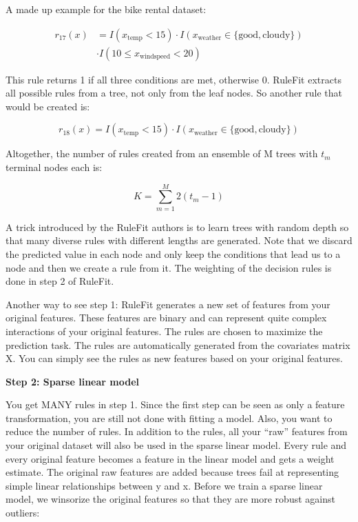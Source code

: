 \documentclass[
  11pt,
]{scrbook}
\begin{document}
A made up example for the bike rental dataset:

\begin{align*}
r_{17}(x) & = I(x_{\text{temp}}<15) \cdot I(x_{\text{weather}}\in\{\text{good},\text{cloudy}\}) \\
            & \cdot I(10\leq x_{\text{windspeed}}<20) 
\end{align*}

This rule returns 1 if all three conditions are met, otherwise 0.
RuleFit extracts all possible rules from a tree, not only from the leaf nodes.
So another rule that would be created is:

\[r_{18}(x)=I(x_{\text{temp}}<15)\cdot I(x_{\text{weather}}\in\{\text{good},\text{cloudy}\})\]

Altogether, the number of rules created from an ensemble of M trees with \(t_m\) terminal nodes each is:

\[K=\sum_{m=1}^M2(t_m-1)\]

A trick introduced by the RuleFit authors is to learn trees with random depth so that many diverse rules with different lengths are generated.
Note that we discard the predicted value in each node and only keep the conditions that lead us to a node and then we create a rule from it.
The weighting of the decision rules is done in step 2 of RuleFit.

Another way to see step 1:
RuleFit generates a new set of features from your original features.
These features are binary and can represent quite complex interactions of your original features.
The rules are chosen to maximize the prediction task.
The rules are automatically generated from the covariates matrix X.
You can simply see the rules as new features based on your original features.

\textbf{Step 2: Sparse linear model}

You get MANY rules in step 1.
Since the first step can be seen as only a feature transformation, you are still not done with fitting a model.
Also, you want to reduce the number of rules.
In addition to the rules, all your ``raw'' features from your original dataset will also be used in the sparse linear model.
Every rule and every original feature becomes a feature in the linear model and gets a weight estimate.
The original raw features are added because trees fail at representing simple linear relationships between y and x.
Before we train a sparse linear model, we winsorize the original features so that they are more robust against outliers:
\end{document}
